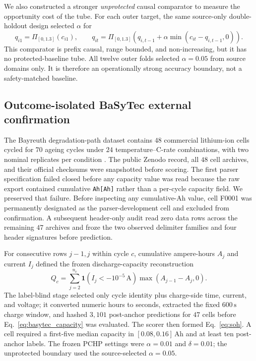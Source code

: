 \documentclass[11pt]{article}
\begin{document}
We also constructed a stronger \emph{unprotected} causal comparator to measure the opportunity cost of the tube. For each outer target, the same source-only double-holdout design selected $\alpha$ for
\[
q_{i1}=\Pi_{[0,1.3]}(c_{i1}),\qquad
q_{it}=\Pi_{[0,1.3]}\!\left(q_{i,t-1}+\alpha\min(c_{it}-q_{i,t-1},0)\right).
\]
This comparator is prefix causal, range bounded, and non-increasing, but it has no protected-baseline tube. All twelve outer folds selected $\alpha=0.05$ from source domains only. It is therefore an operationally strong accuracy boundary, not a safety-matched baseline.

\subsection{Outcome-isolated BaSyTec external confirmation}

The Bayreuth degradation-path dataset contains $48$ commercial lithium-ion cells cycled for $70$ ageing cycles under $24$ temperature--C-rate combinations, with two nominal replicates per condition \citep{ramasubramanian2025degradation,roder2025degradationdata}. The public Zenodo record, all $48$ cell archives, and their official checksums were snapshotted before scoring. The first parser specification failed closed before any capacity value was read because the raw export contained cumulative \texttt{Ah[Ah]} rather than a per-cycle capacity field. We preserved that failure. Before inspecting any cumulative-Ah value, cell F0001 was permanently designated as the parser-development cell and excluded from confirmation. A subsequent header-only audit read zero data rows across the remaining $47$ archives and froze the two observed delimiter families and four header signatures before prediction.

For consecutive rows $j-1,j$ within cycle $c$, cumulative ampere-hours $A_j$ and current $I_j$ defined the frozen discharge-capacity reconstruction
\begin{equation}
Q_c=\sum_{j=2}^{n_c}\mathbf{1}\!\left(I_j<-10^{-5}\,\mathrm{A}\right)
\max(A_{j-1}-A_j,0).
\label{eq:basytec_capacity}
\end{equation}
The label-blind stage selected only cycle identity plus charge-side time, current, and voltage; it converted numeric hours to seconds, extracted the fixed $600\,\mathrm{s}$ charge window, and hashed $3{,}101$ post-anchor predictions for $47$ cells before Eq.~\eqref{eq:basytec_capacity} was evaluated. The scorer then formed Eq.~\eqref{eq:soh}. A cell required a first-five median capacity in $[0.08,0.16]\,\mathrm{Ah}$ and at least ten post-anchor labels. The frozen PCHP settings were $\alpha=0.01$ and $\delta=0.01$; the unprotected boundary used the source-selected $\alpha=0.05$.
\end{document}
